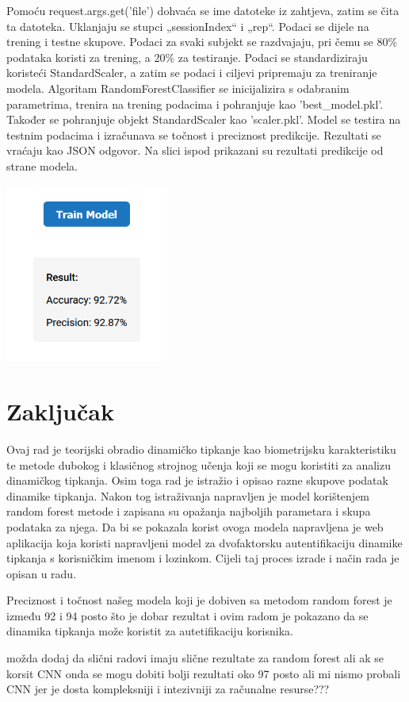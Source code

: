 \documentclass[]{foi}
\begin{document}
Pomoću request.args.get('file') dohvaća se ime datoteke iz zahtjeva, zatim se čita ta datoteka. Uklanjaju se stupci „sessionIndex“ i „rep“. Podaci se dijele na trening i testne skupove. Podaci za svaki subjekt se razdvajaju, pri čemu se 80\% podataka koristi za trening, a 20\% za testiranje. Podaci se standardiziraju koristeći StandardScaler, a zatim se podaci i ciljevi pripremaju za treniranje modela. Algoritam RandomForestClassifier se inicijalizira s odabranim parametrima, trenira na trening podacima i pohranjuje kao 'best\_model.pkl'. Također se pohranjuje objekt StandardScaler kao 'scaler.pkl'. Model se testira na testnim podacima i izračunava se točnost i preciznost predikcije. Rezultati se vraćaju kao JSON odgovor. Na slici ispod prikazani su rezultati predikcije od strane modela.

\begin{center}
    \includegraphics[width=0.4\textwidth]{slike/app_model_rezultati.png}
    \label{fig:app-model-rezultati}
\end{center}

\chapter{Zaključak}

Ovaj rad je teorijski obradio dinamičko tipkanje kao biometrijsku karakteristiku te metode dubokog i klasičnog strojnog učenja koji se mogu koristiti za analizu dinamičkog tipkanja. Osim toga rad je istražio i opisao razne skupove podatak dinamike tipkanja. Nakon tog istraživanja napravljen je model korištenjem random forest metode i zapisana su opažanja najboljih parametara i skupa podataka za njega. Da bi se pokazala korist ovoga modela napravljena je web aplikacija koja koristi napravljeni model za dvofaktorsku autentifikaciju dinamike tipkanja s korisničkim imenom i lozinkom. Cijeli taj proces izrade i način rada je opisan u radu. 

Preciznost i točnost našeg modela koji je dobiven sa metodom random forest je između 92 i 94 posto što je dobar rezultat i ovim radom je pokazano da se dinamika tipkanja može koristit za autetifikaciju korisnika. 

možda dodaj da slični radovi imaju slične rezultate za random forest ali ak se korsit CNN onda se mogu dobiti bolji rezultati oko 97 posto ali mi nismo probali CNN jer je dosta kompleksniji i intezivniji za računalne resurse???


\makebackmatter
\end{document}
